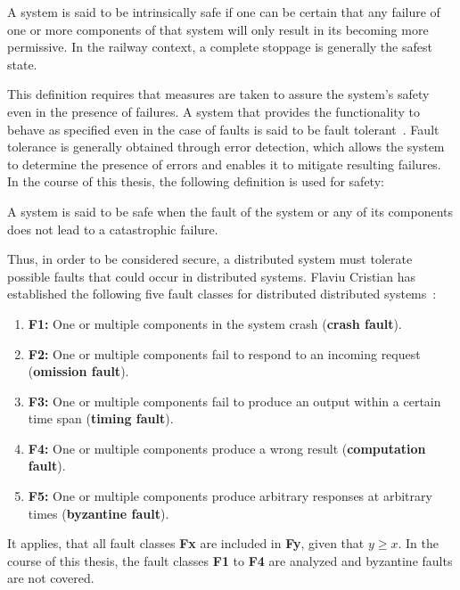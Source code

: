 \begin{definition}
A system is said to be intrinsically safe if one can be certain that any failure of one or more components of that system will only result in its becoming more permissive.
In the railway context, a complete stoppage is generally the safest state.
\label{def:intrinsic_safety}
\end{definition}

This definition requires that measures are taken to assure the system's safety even in the presence of failures.
A system that provides the functionality to behave as specified even in the case of faults is said to be fault tolerant~\cite{AvizienisDependability2001}.
Fault tolerance is generally obtained through error detection, which allows the system to determine the presence of errors and enables it to mitigate resulting failures.
In the course of this thesis, the following definition is used for safety:

\begin{definition}
A system is said to be safe when the fault of the system or any of its components does not lead to a catastrophic failure.
\label{def:safety}
\end{definition}

Thus, in order to be considered secure, a distributed system must tolerate possible faults that could occur in distributed systems.
Flaviu Cristian has established the following five fault classes for distributed distributed systems~\cite{CristianFaultModel}:

\begin{enumerate}
\item \textbf{F1:} One or multiple components in the system crash (\textbf{crash fault}).
\item \textbf{F2:} One or multiple components fail to respond to an incoming request (\textbf{omission fault}).
\item \textbf{F3:} One or multiple components fail to produce an output within a certain time span (\textbf{timing fault}).
\item \textbf{F4:} One or multiple components produce a wrong result (\textbf{computation fault}).
\item \textbf{F5:} One or multiple components produce arbitrary responses at arbitrary times (\textbf{byzantine fault}).
\end{enumerate}

It applies, that all fault classes \textbf{Fx} are included in \textbf{Fy}, given that $y \geq x$.
In the course of this thesis, the fault classes \textbf{F1} to \textbf{F4} are analyzed and byzantine faults are not covered.
\\

